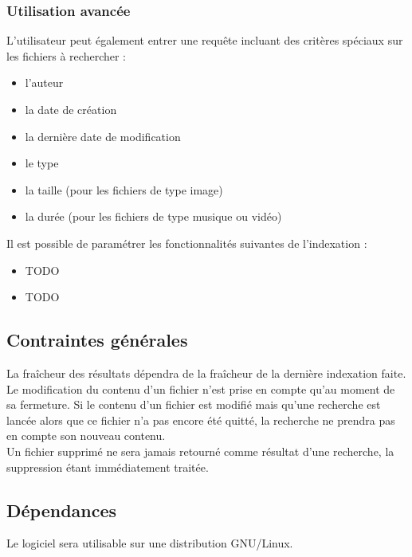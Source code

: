 \documentclass[a4paper,10pt]{article}
\begin{document}
\subsubsection{Utilisation avancée}
L'utilisateur peut également entrer une requête incluant des critères spéciaux
sur les fichiers à rechercher :
\begin{itemize}
 \item l'auteur
 \item la date de création
 \item la dernière date de modification
 \item le type
 \item la taille (pour les fichiers de type image)
 \item la durée (pour les fichiers de type musique ou vidéo)
\end{itemize}
Il est possible de paramétrer les fonctionnalités suivantes de l'indexation :
\begin{itemize}
 \item TODO
 \item TODO
\end{itemize}


\subsection{Contraintes générales}
La fraîcheur des résultats dépendra de la fraîcheur de la dernière indexation faite.\\
Le modification du contenu d'un fichier n'est prise en compte qu'au moment de sa
fermeture. Si le contenu d'un fichier est modifié mais qu'une recherche est
lancée alors que ce fichier n'a pas encore été quitté, la recherche ne prendra
pas en compte son nouveau contenu.\\
Un fichier supprimé ne sera jamais retourné comme résultat d'une recherche, la
suppression étant immédiatement traitée.


\subsection{Dépendances}
Le logiciel sera utilisable sur une distribution GNU/Linux.

\newpage
\end{document}
